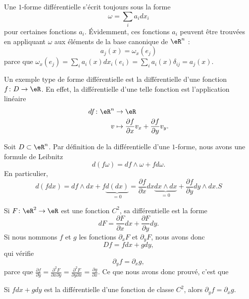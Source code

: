Une $1$-forme différentielle s'écrit toujours sous la forme
\begin{equation}
	\omega=\sum_i a_idx_i
\end{equation}
pour certaines fonctions $a_i$. Évidemment, ces fonctions $a_i$ peuvent être trouvées en appliquant $\omega$ aux éléments de la base canonique de $\eR^n$ :
\begin{equation}
	a_j(x)=\omega_x(e_j)
\end{equation}
parce que $\omega_x(e_j)=\sum_ia_i(x)dx_i(e_i)=\sum_ia_i(x)\delta_{ij}=a_j(x)$.


\begin{example}
    Un exemple type de forme différentielle est la différentielle d'une fonction $f\colon D\to \eR$. En effet, la différentielle d'une telle fonction est l'application linéaire
    \begin{equation}
        \begin{aligned}
            df\colon \eR^n&\to \eR \\
            v&\mapsto \frac{ \partial f }{ \partial x }v_x+\frac{ \partial f }{ \partial y }v_y. 
        \end{aligned}
    \end{equation}
\end{example}

Soit $D\subset\eR^n$. Par définition de la différentielle d'une $1$-forme, nous avons une formule de Leibnitz
\begin{equation}
    d(f\omega)=df\wedge\omega+fd\omega.
\end{equation}
En particulier,
\begin{equation}
    d(fdx)=df\wedge dx+f\underbrace{d(dx)}_{=0}=\frac{ \partial f }{ \partial x }dx\underbrace{dx\wedge dx}_{=0}+\frac{ \partial f }{ \partial y }dy\wedge dx. S
\end{equation}

Si $F\colon \eR^2\to \eR$ est une fonction $C^2$, sa différentielle est la forme
\begin{equation}
    dF=\frac{ \partial F }{ \partial x }dx+\frac{ \partial F }{ \partial y }dy.
\end{equation}
Si nous nommons $f$ et $g$ les fonctions $\partial_xF$ et $\partial_yF$, nous avons donc
\begin{equation}
    Df=fdx+gdy,
\end{equation}
qui vérifie
\begin{equation}
    \partial_yf=\partial_xg,
\end{equation}
parce que $\frac{ \partial f }{ \partial y }=\frac{ \partial^2F  }{ \partial x\partial y }=\frac{ \partial^2F  }{ \partial y\partial x }=\frac{ \partial g }{ \partial x }$. Ce que nous avons donc prouvé, c'est que 
\begin{lemma}
Si $fdx+gdy$ est la différentielle d'une fonction de classe $C^2$, alors $\partial_yf=\partial_xg$.
\end{lemma}

